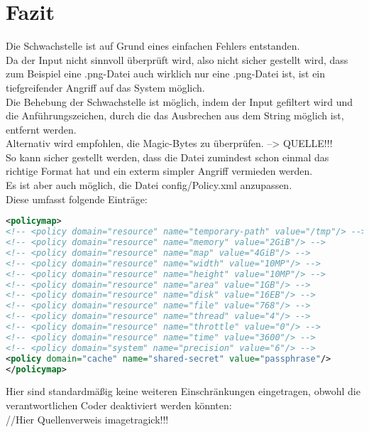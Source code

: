 \chapter{Fazit}\label{ch:fazit}

Die Schwachstelle ist auf Grund eines einfachen Fehlers entstanden.\\
Da der Input nicht sinnvoll überprüft wird, also nicht sicher gestellt wird, dass zum Beispiel eine .png-Datei auch wirklich nur eine .png-Datei ist, ist ein tiefgreifender Angriff auf das System möglich.\\

Die Behebung der Schwachstelle ist möglich, indem der Input gefiltert wird und die Anführungszeichen, durch die das Ausbrechen aus dem String möglich ist, entfernt werden.\\

Alternativ wird empfohlen, die Magic-Bytes zu überprüfen. --> QUELLE!!!\\
So kann sicher gestellt werden, dass die Datei zumindest schon einmal das richtige Format hat und ein exterm simpler Angriff vermieden werden.\\

Es ist aber auch möglich, die Datei config/Policy.xml anzupassen.\\
Diese umfasst folgende Einträge:\\

\begin{lstlisting}[firstnumber=47, language=XML, caption=config/Policy.xml Inhalt,label={lst:lstlisting}]
<policymap>
<!-- <policy domain="resource" name="temporary-path" value="/tmp"/> -->
<!-- <policy domain="resource" name="memory" value="2GiB"/> -->
<!-- <policy domain="resource" name="map" value="4GiB"/> -->
<!-- <policy domain="resource" name="width" value="10MP"/> -->
<!-- <policy domain="resource" name="height" value="10MP"/> -->
<!-- <policy domain="resource" name="area" value="1GB"/> -->
<!-- <policy domain="resource" name="disk" value="16EB"/> -->
<!-- <policy domain="resource" name="file" value="768"/> -->
<!-- <policy domain="resource" name="thread" value="4"/> -->
<!-- <policy domain="resource" name="throttle" value="0"/> -->
<!-- <policy domain="resource" name="time" value="3600"/> -->
<!-- <policy domain="system" name="precision" value="6"/> -->
<policy domain="cache" name="shared-secret" value="passphrase"/>
</policymap>
\end{lstlisting}
\vspace{5mm}

Hier sind standardmäßig keine weiteren Einschränkungen eingetragen, obwohl die verantwortlichen Coder deaktiviert werden könnten:\\
//Hier Quellenverweis imagetragick!!!

